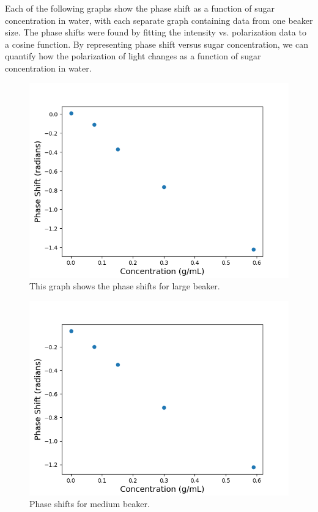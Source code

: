 \newpage
Each of the following graphs show the phase shift as a function of sugar concentration in water, with each separate graph containing data from one beaker size. 
The phase shifts were found by fitting the intensity vs. polarization data to a cosine function. By representing phase shift versus sugar concentration,
we can quantify how the polarization of light changes as a function of sugar concentration in water.

\begin{figure}[H]
    \begin{center}
        \includegraphics[width=\columnwidth]{../figures/large_beaker_phase_shifts.png}
    \end{center}
    \caption{This graph shows the phase shifts for large beaker.}
    \label{fig:large_beaker_phase_shifts}
\end{figure}

\begin{figure}[H]
    \begin{center}
        \includegraphics[width=\columnwidth]{../figures/medium_beaker_phase_shifts.png}
    \end{center}
    \caption{Phase shifts for medium beaker.}
    \label{fig:medium_beaker_phase_shifts}
\end{figure}

